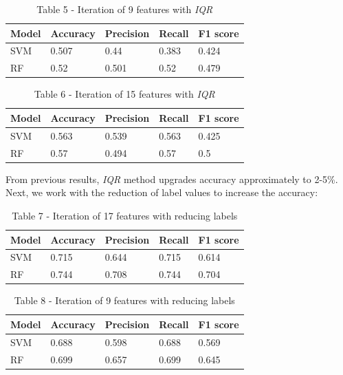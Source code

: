 \begin{table}[H]
\caption*{Table 5 - Iteration of 9 features with \emph{IQR}}
\centering
\begin{tabular}{|l|l|l|l|l|}
\hline
Model & Accuracy & Precision & Recall & F1 score \\ \hline
SVM   & 0.507    & 0.44      & 0.383  & 0.424    \\ \hline
RF    & 0.52     & 0.501     & 0.52   & 0.479    \\ \hline
\end{tabular}
\end{table}

\begin{table}[H]
\caption*{Table 6 - Iteration of 15 features with \emph{IQR}}
\centering
\begin{tabular}{|l|l|l|l|l|}
\hline
Model & Accuracy & Precision & Recall & F1 score \\ \hline
SVM   & 0.563    & 0.539     & 0.563  & 0.425    \\ \hline
RF    & 0.57     & 0.494     & 0.57   & 0.5      \\ \hline
\end{tabular}
\end{table}

From previous results, \emph{IQR} method upgrades accuracy approximately
to 2-5\%. Next, we work with the reduction of label values to increase
the accuracy:

\begin{table}[H]
\caption*{Table 7 - Iteration of 17 features with reducing labels}
\centering
\begin{tabular}{|l|l|l|l|l|}
\hline
Model & Accuracy & Precision & Recall & F1 score \\ \hline
SVM   & 0.715    & 0.644     & 0.715  & 0.614    \\ \hline
RF    & 0.744    & 0.708     & 0.744  & 0.704    \\ \hline
\end{tabular}
\end{table}

\begin{table}[H]
\caption*{Table 8 - Iteration of 9 features with reducing labels}
\centering
\begin{tabular}{|l|l|l|l|l|}
\hline
Model & Accuracy & Precision & Recall & F1 score \\ \hline
SVM   & 0.688    & 0.598     & 0.688  & 0.569    \\ \hline
RF    & 0.699    & 0.657     & 0.699  & 0.645    \\ \hline
\end{tabular}
\end{table}

